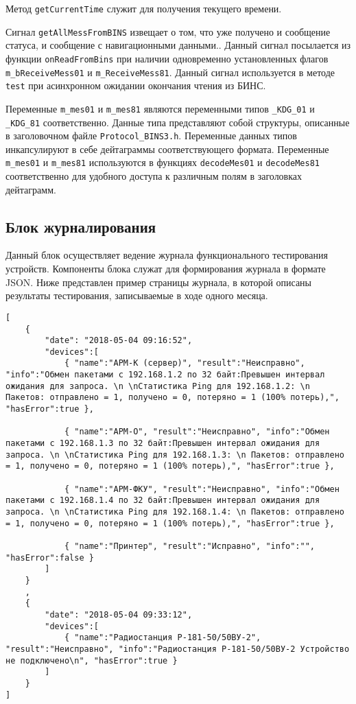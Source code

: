 \begin{enum}
	\item Метод \texttt{getCurrentTime} служит для получения текущего времени.

	\item Сигнал \texttt{getAllMessFromBINS} извещает о том, что уже получено и сообщение статуса, и сообщение с
		навигационными данными.. Данный сигнал посылается из функции \texttt{onReadFromBins} при наличии
		одновременно установленных флагов
		\texttt{m\_bReceiveMess01} и \texttt{m\_ReceiveMess81}. Данный сигнал используется в методе
		\texttt{test} при асинхронном ожидании окончания чтения из БИНС.

	\item Переменные \texttt{m\_mes01} и \texttt{m\_mes81} являются переменными типов \texttt{\_KDG\_01} и
		\texttt{\_KDG\_81} соответственно. Данные типа представляют собой структуры, описанные в заголовочном
		файле \texttt{Protocol\_BINS3.h}. Переменные данных типов инкапсулируют в себе дейтаграммы
		соответствующего формата. Переменные \texttt{m\_mes01} и \texttt{m\_mes81} используются в функциях
		\texttt{decodeMes01} и \texttt{decodeMes81} соответственно для удобного доступа к различным полям в
		заголовках дейтаграмм.
\end{enum}

\subsection{Блок журналирования}
Данный блок осуществляет ведение журнала функционального тестирования устройств. Компоненты блока служат для
формирования журнала в формате JSON.
Ниже представлен пример страницы журнала, в которой описаны результаты тестирования, записываемые в ходе одного месяца.
\medskip
\begin{verbatim}
[
	{
		"date": "2018-05-04 09:16:52",
		"devices":[
			{ "name":"АРМ-К (сервер)", "result":"Неисправно", "info":"Обмен пакетами с 192.168.1.2 по 32 байт:Превышен интервал ожидания для запроса. \n \nСтатистика Ping для 192.168.1.2: \n Пакетов: отправлено = 1, получено = 0, потеряно = 1 (100% потерь),", "hasError":true },

			{ "name":"АРМ-О", "result":"Неисправно", "info":"Обмен пакетами с 192.168.1.3 по 32 байт:Превышен интервал ожидания для запроса. \n \nСтатистика Ping для 192.168.1.3: \n Пакетов: отправлено = 1, получено = 0, потеряно = 1 (100% потерь),", "hasError":true },

			{ "name":"АРМ-ФКУ", "result":"Неисправно", "info":"Обмен пакетами с 192.168.1.4 по 32 байт:Превышен интервал ожидания для запроса. \n \nСтатистика Ping для 192.168.1.4: \n Пакетов: отправлено = 1, получено = 0, потеряно = 1 (100% потерь),", "hasError":true },

			{ "name":"Принтер", "result":"Исправно", "info":"", "hasError":false }
		]
	}
	,
	{
		"date": "2018-05-04 09:33:12",
		"devices":[
			{ "name":"Радиостанция Р-181-50/50ВУ-2", "result":"Неисправно", "info":"Радиостанция Р-181-50/50ВУ-2 Устройство не подключено\n", "hasError":true }
		]
	}
]

\end{verbatim}
\medskip

